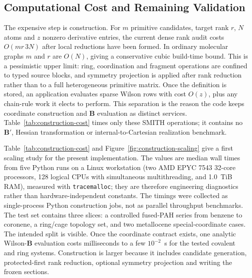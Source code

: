 \documentclass[journal=jctcce,manuscript=article,layout=traditional]{achemso}
\newcommand{\Bmat}{\mathbf{B}}
\theoremstyle{definition}
\begin{document}
\subsection{Computational Cost and Remaining Validation}

The expensive step is construction.  For \(m\) primitive candidates, target rank
\(r\), \(N\) atoms and \(z\) nonzero derivative entries, the current dense rank
audit costs \(O(mr\,3N)\) after local reductions have been formed.  In ordinary
molecular graphs \(m\) and \(r\) are \(O(N)\), giving a conservative cubic
build-time bound.  This is a pessimistic upper limit: ring, coordination and
fragment operations are confined to typed source blocks, and symmetry projection
is applied after rank reduction rather than to a full heterogeneous primitive
matrix.  Once the definition is stored, an application evaluates sparse Wilson
rows with cost \(O(z)\), plus any chain-rule work it elects to perform.  This
separation is the reason the code keeps coordinate construction and
\(\Bmat\) evaluation as distinct services.  Table~\ref{tab:construction-cost}
times only these SMITH operations; it contains no \(\Bmat'\), Hessian
transformation or internal-to-Cartesian realization benchmark.

Table~\ref{tab:construction-cost} and Figure~\ref{fig:construction-scaling}
give a first scaling study for the present implementation.  The values are
median wall times from five Python runs on a Linux workstation
(two AMD EPYC 7543 32-core processors, 128 logical
CPUs with simultaneous multithreading, and 1.0~TiB RAM), measured with
\texttt{tracemalloc}; they are therefore engineering diagnostics rather than
hardware-independent constants.  The timings were collected as single-process
Python construction jobs, not as parallel throughput benchmarks.  The test set
contains three slices: a controlled fused-PAH series from benzene to coronene,
a ring/cage topology set, and two metallocene special-coordinate cases.  The
intended split is visible.  Once the coordinate contract exists, one analytic
Wilson-\(\Bmat\) evaluation costs milliseconds to a few \(10^{-2}\)~s for the
tested covalent and ring systems.  Construction is larger because it includes
candidate generation, protected-first rank reduction, optional symmetry
projection and writing the frozen sections.
\end{document}
